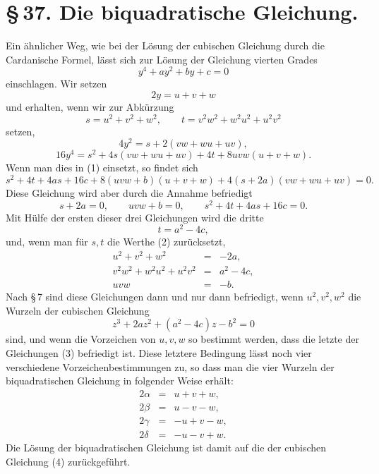 \documentclass[11pt]{article}
\begin{document}
\section*{\S\,37. Die biquadratische Gleichung.}

Ein ähnlicher Weg, wie bei der Lösung der cubischen Gleichung durch die Cardanische Formel, lässt sich zur Lösung der Gleichung vierten Grades
\begin{equation}
 y^4+ay^2+by+c=0
\tag{1}
\end{equation}
einschlagen. Wir setzen
\[
 2y=u+v+w
\]
und erhalten, wenn wir zur Abkürzung
\begin{equation}
 s=u^2+v^2+w^2,\qquad
 t=v^2w^2+w^2u^2+u^2v^2
\tag{2}
\end{equation}
setzen,
\[
 4y^2=s+2(vw+wu+uv),
\]
\[
 16y^4=s^2+4s(vw+wu+uv)+4t+8uvw(u+v+w).
\]
Wenn man dies in (1) einsetzt, so findet sich
\[
 s^2+4t+4as+16c+8(uvw+b)(u+v+w)
  +4(s+2a)(vw+wu+uv)=0.
\]
Diese Gleichung wird aber durch die Annahme befriedigt
\[
 s+2a=0,\qquad uvw+b=0,\qquad s^2+4t+4as+16c=0.
\]
Mit Hülfe der ersten dieser drei Gleichungen wird die dritte
\[
 t=a^2-4c,
\]
und, wenn man für $s,t$ die Werthe (2) zurücksetzt,
\begin{equation}
\begin{array}{rcl}
 u^2+v^2+w^2&=&-2a,\\
 v^2w^2+w^2u^2+u^2v^2&=&a^2-4c,\\
 uvw&=&-b.
\end{array}
\tag{3}
\end{equation}
Nach \S\,7 sind diese Gleichungen dann und nur dann befriedigt, wenn $u^2,v^2,w^2$ die Wurzeln der cubischen Gleichung
\begin{equation}
 z^3+2az^2+(a^2-4c)z-b^2=0
\tag{4}
\end{equation}
sind, und wenn die Vorzeichen von $u,v,w$ so bestimmt werden, dass die letzte der Gleichungen (3) befriedigt ist. Diese letztere Bedingung lässt noch vier verschiedene Vorzeichenbestimmungen zu, so dass man die vier Wurzeln der biquadratischen Gleichung in folgender Weise erhält:
\begin{equation}
\begin{array}{rcl}
2\alpha&=&u+v+w,\\
2\beta&=&u-v-w,\\
2\gamma&=&-u+v-w,\\
2\delta&=&-u-v+w.
\end{array}
\tag{5}
\end{equation}
Die Lösung der biquadratischen Gleichung ist damit auf die der cubischen Gleichung (4) zurückgeführt.
\end{document}
